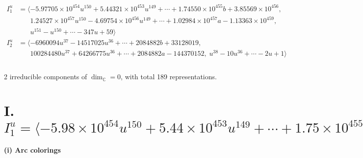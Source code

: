 \documentclass[1p]{elsarticle_modified}
\theoremstyle{definition}
\begin{document}
\begin{align*}
I^u_{1}&=\langle 
-5.97705\times10^{454} u^{150}+5.44321\times10^{453} u^{149}+\cdots+1.74550\times10^{455} b+3.85569\times10^{456},\\
\phantom{I^u_{1}}&\phantom{= \langle  }1.24527\times10^{457} u^{150}-4.69754\times10^{456} u^{149}+\cdots+1.02984\times10^{457} a-1.13363\times10^{459},\\
\phantom{I^u_{1}}&\phantom{= \langle  }u^{151}- u^{150}+\cdots-347 u+59\rangle \\
I^u_{2}&=\langle 
-6960094 u^{37}-14517025 u^{36}+\cdots+2084882 b+33128019,\\
\phantom{I^u_{2}}&\phantom{= \langle  }100284480 u^{37}+64266775 u^{36}+\cdots+2084882 a-144370152,\;u^{38}-10 u^{36}+\cdots-2 u+1\rangle \\
\\
\end{align*}
\raggedright * 2 irreducible components of $\dim_{\mathbb{C}}=0$, with total 189 representations.\\
\newpage
\renewcommand{\arraystretch}{1}
\centering \section*{I. $I^u_{1}= \langle -5.98\times10^{454} u^{150}+5.44\times10^{453} u^{149}+\cdots+1.75\times10^{455} b+3.86\times10^{456},\;1.25\times10^{457} u^{150}-4.70\times10^{456} u^{149}+\cdots+1.03\times10^{457} a-1.13\times10^{459},\;u^{151}- u^{150}+\cdots-347 u+59 \rangle$}
\flushleft \textbf{(i) Arc colorings}\\
\end{document}
